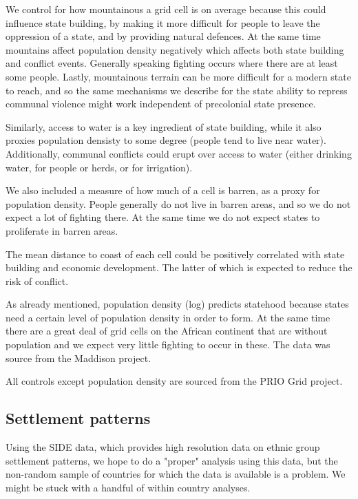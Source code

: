 \documentclass[12pt]{article}
\begin{document}
We control for how mountainous a grid cell is on average because this could
influence state building, by making it more difficult for people to leave
the oppression of a state, and by providing natural defences. At the same time
mountains affect population density negatively which affects both state
building and conflict events. Generally speaking fighting occurs where there are
at least some people. Lastly, mountainous terrain can be more difficult for a
modern state to reach, and so the same mechanisms we describe for the state
ability to repress communal violence might work independent of precolonial state
presence. 


Similarly, access to water is a key ingredient of state building, while it also
proxies population densisty to some degree (people tend to live near water).
Additionally, communal conflicts could erupt over access to water (either
drinking water, for people or herds, or for irrigation).

We also included a measure of how much of
a cell is barren, as a proxy for population density. People generally do not
live in barren areas, and so we do not expect a lot of fighting there. At the
same time we do not expect states to proliferate in barren areas.

The mean distance to coast of each cell could be positively correlated with
state building and economic development. The latter of which is expected to
reduce the risk of conflict.

As already mentioned, population density (log) predicts statehood because states
need a certain level of population density in order to form. At the same time
there are a great deal of grid cells on the African continent that are without
population and we expect very little fighting to occur in these. The data was
source from the Maddison project.

All controls except population density are sourced from the PRIO Grid project.

\subsection{Settlement patterns}

Using the SIDE data, which provides high resolution data on ethnic group
settlement patterns, we hope to do a "proper" analysis using this data, but the
non-random sample of countries for which the data is available is a problem. We
might be stuck with a handful of within country analyses.
\end{document}
